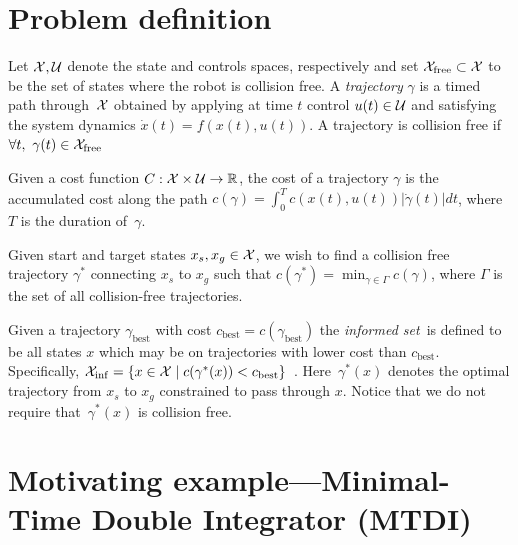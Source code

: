 \documentclass[letterpaper, 10 pt, conference]{ieeeconf}  %
\begin{document}
\section{Problem definition}
\label{sec:pdef}
Let $\mathcal{X}, \mathcal{U}$ denote the state and controls spaces, respectively and set $\mathcal{X}_{\rm free} \subset \mathcal{X}$ to be the set of states where the robot is collision free.
A \emph{trajectory} $\gamma$ is a timed path through~$\mathcal{X}$ obtained by applying at time $t$ control $u(t) \in \mathcal{U}$ and satisfying the system dynamics 
$\dot{x}(t) = f( x(t) , u(t) )$.
A trajectory is collision free if $\forall t,~\gamma(t) \in \mathcal{X}_{\rm free}$

Given a cost function $C : \mathcal{X} \times \mathcal{U} \rightarrow \mathbb{R}$, the cost of a trajectory $ \gamma $ is the accumulated cost along the path
$c(\gamma) = \int_0^{T} c( x(t), u(t) ) |\dot{\gamma}(t)|dt$, 
where $T$ is the duration of~$\gamma$.

Given start and target states $x_s, x_g \in \mathcal{X}$, we wish to find a collision free trajectory $\gamma^*$ connecting $x_s$ to $x_g$ such that 
$c(\gamma^*) = \min_{\gamma \in \Gamma} c(\gamma)$, where $\Gamma$ is the set of all collision-free trajectories.

Given a trajectory $\gamma_{\text{best}}$ with cost $c_{\text{best}} = c(\gamma_{\text{best}})$ the \emph{informed set}~\Cinf is defined to be all states $x$  which may be on trajectories with lower cost than $c_{\text{best}}$.
Specifically,
$
\mathcal{X}_{\rm {inf}} = \{ x \in \mathcal{X} \mid  
		c ( \gamma^*(x) ) < c_{\rm best} \} $~\cite{GSB14}.
Here~$ \gamma^*(x) $ denotes the optimal trajectory  from $ x_s $ to $ x_g $ constrained to pass through $ x $.
Notice that we do not require that~$ \gamma^*(x) $ is collision free.


\section{Motivating example---Minimal-Time Double Integrator (MTDI)}
\label{sec:mtdi}
\end{document}
